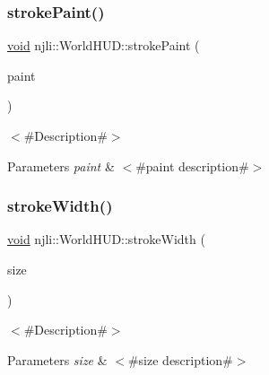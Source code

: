\subsubsection{\texorpdfstring{stroke\+Paint()}{strokePaint()}}
{\footnotesize\ttfamily \mbox{\hyperlink{_thread_8h_af1e856da2e658414cb2456cb6f7ebc66}{void}} njli\+::\+World\+H\+U\+D\+::stroke\+Paint (\begin{DoxyParamCaption}\item[{\mbox{\hyperlink{structnjli_1_1_j_l_i_paint}{J\+L\+I\+Paint}}}]{paint }\end{DoxyParamCaption})}

$<$\#\+Description\#$>$


\begin{DoxyParams}{Parameters}
{\em paint} & $<$\#paint description\#$>$ \\
\hline
\end{DoxyParams}
\mbox{\label{classnjli_1_1_world_h_u_d_af219f2c63d6a6bdd85f6871e113be598}} 
\subsubsection{\texorpdfstring{stroke\+Width()}{strokeWidth()}}
{\footnotesize\ttfamily \mbox{\hyperlink{_thread_8h_af1e856da2e658414cb2456cb6f7ebc66}{void}} njli\+::\+World\+H\+U\+D\+::stroke\+Width (\begin{DoxyParamCaption}\item[{\mbox{\hyperlink{_util_8h_a5f6906312a689f27d70e9d086649d3fd}{f32}}}]{size }\end{DoxyParamCaption})}

$<$\#\+Description\#$>$


\begin{DoxyParams}{Parameters}
{\em size} & $<$\#size description\#$>$ \\
\hline
\end{DoxyParams}
\mbox{\label{classnjli_1_1_world_h_u_d_a0bab9dfc4848ec90b66fb3757c51f4b2}} 

